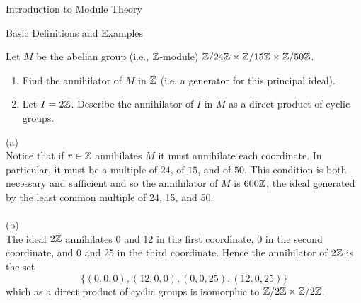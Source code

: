 \begin{chapter}{Introduction to Module Theory}
\begin{section}{Basic Definitions and Examples}
\begin{problem}\label{ex:10.1.11}
Let $M$ be the abelian group (i.e., $\mathbb{Z}$-module) $\mathbb{Z}/24\mathbb{Z} \times \mathbb{Z}/15\mathbb{Z} \times \mathbb{Z}/50\mathbb{Z}$. \begin{enumerate}
\item[(a)] Find the annihilator of $M$ in $\mathbb{Z}$ (i.e. a generator for this principal ideal).
\item[(b)] Let $I = 2\mathbb{Z}$. Describe the annihilator of $I$ in $M$ as a direct product of cyclic groups.
\end{enumerate}
\end{problem}
\begin{solution}
(a)\\
Notice that if $r\in \mathbb{Z}$ annihilates $M$ it must annihilate each coordinate. In particular, it must be a multiple of $24$, of $15$, and of $50$. This condition is both necessary and sufficient and so the annihilator of $M$ is $600\mathbb{Z}$, the ideal generated by the least common multiple of 24, 15, and 50.\\\\
(b)\\
The ideal $2\mathbb{Z}$ annihilates 0 and 12 in the first coordinate, 0 in the second coordinate, and 0 and 25 in the third coordinate. Hence the annihilator of $2\mathbb{Z}$ is the set \[
\{(0,0,0), (12,0,0), (0,0,25), (12,0,25)\}
\]
which as a direct product of cyclic groups is isomorphic to $\mathbb{Z}/2\mathbb{Z} \times \mathbb{Z}/2\mathbb{Z}$. 

\end{solution}\oneperpage




\end{section}
\end{chapter}
